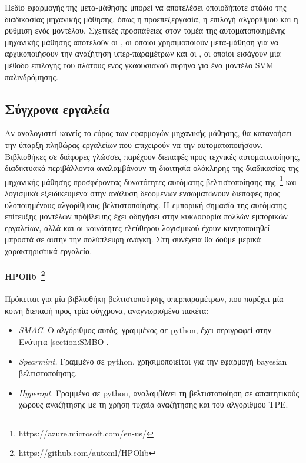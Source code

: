  Πεδίο εφαρμογής της μετα-μάθησης μπορεί να αποτελέσει οποιοδήποτε στάδιο της διαδικασίας μηχανικής μάθησης, όπως η προεπεξεργασία, η επιλογή αλγορίθμου και η ρύθμιση ενός μοντέλου. Σχετικές προσπάθειες στον τομέα της αυτοματοποιημένης μηχανικής μάθησης αποτελούν οι \citet{AAAI1510029}, οι οποίοι χρησιμοποιούν μετα-μάθηση για να αρχικοποιήσουν την αναζήτηση υπερ-παραμέτρων και οι \citet{Soares2004}, οι οποίοι εισάγουν μία μέθοδο επιλογής του πλάτους ενός γκαουσιανού πυρήνα για ένα μοντέλο \gls{SVM} παλινδρόμησης.   
 
 \subsection{Σύγχρονα εργαλεία} \label{section:tools}
 Αν αναλογιστεί κανείς το εύρος των εφαρμογών μηχανικής μάθησης, θα κατανοήσει την ύπαρξη πληθώρας εργαλείων που επιχειρούν να την αυτοματοποιήσουν. Βιβλιοθήκες σε διάφορες γλώσσες παρέχουν διεπαφές προς τεχνικές αυτοματοποίησης, διαδικτυακά περιβάλλοντα αναλαμβάνουν τη διαιτησία ολόκληρης της διαδικασίας της μηχανικής μάθησης προσφέροντας δυνατότητες αυτόματης βελτιστοποίησης της~\footnote{https://azure.microsoft.com/en-us/} και λογισμικά εξειδικευμένα στην ανάλυση δεδομένων ενσωματώνουν διεπαφές προς υλοποιημένους αλγορίθμους βελτιστοποίησης. Η εμπορική σημασία της αυτόματης επίτευξης μοντέλων πρόβλεψης έχει οδηγήσει στην κυκλοφορία πολλών εμπορικών εργαλείων, αλλά και οι κοινότητες ελεύθερου λογισμικού έχουν κινητοποιηθεί μπροστά σε αυτήν την πολύπλευρη ανάγκη. Στη συνέχεια θα δούμε μερικά χαρακτηριστικά εργαλεία.
 \paragraph[HPOlib]{HPOlib~\footnote{https://github.com/automl/HPOlib} }  Πρόκειται για μία βιβλιοθήκη βελτιστοποίησης υπερπαραμέτρων, που παρέχει μία κοινή διεπαφή προς τρία σύγχρονα, αναγνωρισμένα πακέτα: 
 \begin{itemize}
 	\item \textit{ SMAC.} Ο αλγόριθμος αυτός, γραμμένος σε python, έχει περιγραφεί στην Ενότητα \ref{section:SMBO}.
 	\item \textit{ Spearmint.} Γραμμένο σε python, χρησιμοποιείται για την εφαρμογή bayesian βελτιστοποίησης.
 	\item \textit{ Hyperopt.} Γραμμένο σε python, αναλαμβάνει τη βελτιστοποίηση σε απαιτητικούς χώρους αναζήτησης με τη χρήση τυχαία αναζήτησης και του αλγορίθμου TPE.
 \end{itemize}
 
